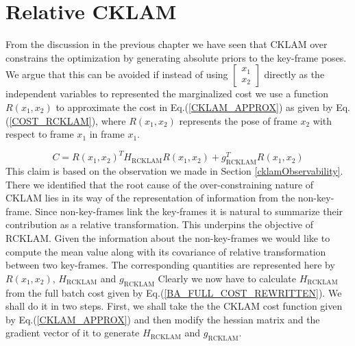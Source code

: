 \chapter{Relative CKLAM}
\label{sec:RCKLAM}

From the discussion in the previous chapter we have seen that CKLAM over constrains the optimization by generating absolute priors to the key-frame poses. We argue that this can be avoided if instead of using $\begin{bmatrix} x_{1} \\ x_{2} \end{bmatrix}$ directly as the independent variables to represented the marginalized cost we use a function $R(x_1, x_2)$ to approximate the cost in Eq.(\ref{CKLAM_APPROX}) as given by Eq.(\ref{COST_RCKLAM}), where $R(x_1, x_2)$ represents the pose of frame $x_2$ with respect to frame $x_1$ in frame $x_1$. 

\begin{equation}
	C = R(x_1, x_2)^TH_\mathrm{RCKLAM}R(x_1, x_2) + g_\mathrm{RCKLAM}^TR(x_1, x_2)
	\label{COST_RCKLAM}
\end{equation}
This claim is based on the observation we made in Section \ref{cklamObservability}. There we identified that the root cause of the over-constraining nature of CKLAM lies in its way of the representation of information from the non-key-frame. Since non-key-frames link the key-frames it is natural to summarize their contribution as a relative transformation. This underpins the objective of RCKLAM. Given the information about the non-key-frames we would like to compute the mean value along with its covariance of relative transformation between two key-frames. The corresponding quantities are represented here by $R(x_1, x_2)$, $H_\mathrm{RCKLAM}$ and $g_\mathrm{RCKLAM}$
Clearly we now have to calculate $H_\mathrm{RCKLAM}$ from the full batch cost given by Eq.(\ref{BA_FULL_COST_REWRITTEN}). We shall do it in two steps. First, we shall take the the CKLAM cost function given by Eq.(\ref{CKLAM_APPROX}) and then modify the hessian matrix and the gradient vector of it to generate $H_\mathrm{RCKLAM}$ and $g_\mathrm{RCKLAM}$.

